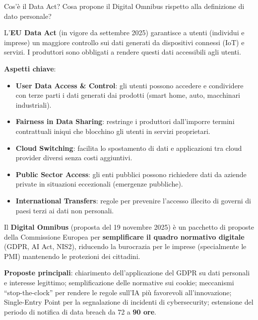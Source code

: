 \documentclass[a4paper,11pt]{article}
\begin{document}
\begin{domanda}
Cos'\`{e} il Data Act? Cosa propone il Digital Omnibus rispetto alla definizione di dato personale?
\end{domanda}

L'\textbf{EU Data Act} (in vigore da settembre 2025) garantisce a utenti (individui e imprese) un maggiore controllo sui dati generati da dispositivi connessi (IoT) e servizi. I produttori sono obbligati a rendere questi dati accessibili agli utenti.

\textbf{Aspetti chiave}:
\begin{itemize}
  \item \textbf{User Data Access \& Control}: gli utenti possono accedere e condividere con terze parti i dati generati dai prodotti (smart home, auto, macchinari industriali).
  \item \textbf{Fairness in Data Sharing}: restringe i produttori dall'imporre termini contrattuali iniqui che blocchino gli utenti in servizi proprietari.
  \item \textbf{Cloud Switching}: facilita lo spostamento di dati e applicazioni tra cloud provider diversi senza costi aggiuntivi.
  \item \textbf{Public Sector Access}: gli enti pubblici possono richiedere dati da aziende private in situazioni eccezionali (emergenze pubbliche).
  \item \textbf{International Transfers}: regole per prevenire l'accesso illecito di governi di paesi terzi ai dati non personali.
\end{itemize}

Il \textbf{Digital Omnibus} (proposta del 19 novembre 2025) \`{e} un pacchetto di proposte della Commissione Europea per \textbf{semplificare il quadro normativo digitale} (GDPR, AI Act, NIS2), riducendo la burocrazia per le imprese (specialmente le PMI) mantenendo le protezioni dei cittadini.

\textbf{Proposte principali}: chiarimento dell'applicazione del GDPR su dati personali e interesse legittimo; semplificazione delle normative sui cookie; meccanismi ``stop-the-clock'' per rendere le regole sull'IA pi\`{u} favorevoli all'innovazione; Single-Entry Point per la segnalazione di incidenti di cybersecurity; estensione del periodo di notifica di data breach da 72 a \textbf{90 ore}.
\end{document}
